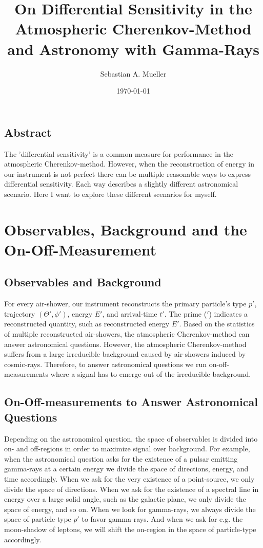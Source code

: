 \documentclass{article}%
\title{
    On Differential Sensitivity in the Atmospheric Cherenkov-Method and Astronomy with Gamma-Rays
}%
\author{Sebastian A. Mueller}%
\date{\today{}}%
\begin{document}
%
\maketitle%
%
\newcommand{\dd}[2]{\frac{\mathrm{d}#1}{\mathrm{d}#2}}
%
\subsection*{Abstract}
The 'differential sensitivity' is a common measure for performance in the atmospheric Cherenkov-method.
%
However, when the reconstruction of energy in our instrument is not perfect there can be multiple reasonable ways to express differential sensitivity.
%
Each way describes a slightly different astronomical scenario.
%
Here I want to explore these different scenarios for myself.
%
\section{Observables, Background and the On-Off-Measurement}
\label{SecObservablesAndOnOff}
\subsection*{Observables and Background}
%
For every air-shower, our instrument reconstructs the primary particle's type $p'$, trajectory $(\Theta', \phi')$, energy $E'$, and arrival-time $t'$.
%
The prime ($'$) indicates a reconstructed quantity, such as reconstructed energy $E'$.
%
Based on the statistics of multiple reconstructed air-showers, the atmospheric Cherenkov-method can answer astronomical questions.
%
However, the atmospheric Cherenkov-method suffers from a large irreducible background caused by air-showers induced by cosmic-rays.
%
Therefore, to answer astronomical questions we run on-off-measurements where a signal has to emerge out of the irreducible background.
%
\subsection*{On-Off-measurements to Answer Astronomical Questions}
Depending on the astronomical question, the space of observables is divided into on- and off-regions in order to maximize signal over background.
%
For example, when the astronomical question asks for the existence of a pulsar emitting gamma-rays at a certain energy we divide the space of directions, energy, and time accordingly.
%
When we ask for the very existence of a point-source, we only divide the space of directions.
%
When we ask for the existence of a spectral line in energy over a large solid angle, such as the galactic plane, we only divide the space of energy, and so on.
%
When we look for gamma-rays, we always divide the space of particle-type $p'$ to favor gamma-rays.
%
And when we ask for e.g. the moon-shadow of leptons, we will shift the on-region in the space of particle-type accordingly.
%
\end{document}
